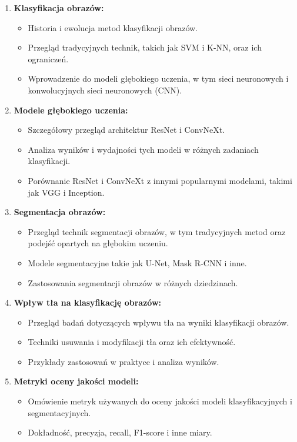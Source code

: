 \begin{enumerate}
    \item \textbf{Klasyfikacja obrazów:}
    \begin{itemize}
        \item Historia i ewolucja metod klasyfikacji obrazów.
        \item Przegląd tradycyjnych technik, takich jak SVM i K-NN, oraz ich ograniczeń.
        \item Wprowadzenie do modeli głębokiego uczenia, w tym sieci neuronowych i 
        konwolucyjnych sieci neuronowych (CNN).
    \end{itemize}
    \item \textbf{Modele głębokiego uczenia:}
    \begin{itemize}
        \item Szczegółowy przegląd architektur ResNet i ConvNeXt.
        \item Analiza wyników i wydajności tych modeli w różnych zadaniach klasyfikacji.
        \item Porównanie ResNet i ConvNeXt z innymi popularnymi modelami, takimi jak VGG i Inception.
    \end{itemize}
    \item \textbf{Segmentacja obrazów:}
    \begin{itemize}
        \item Przegląd technik segmentacji obrazów, w tym tradycyjnych metod oraz 
        podejść opartych na głębokim uczeniu.
        \item Modele segmentacyjne takie jak U-Net, Mask R-CNN i inne.
        \item Zastosowania segmentacji obrazów w różnych dziedzinach.
    \end{itemize}
    \item \textbf{Wpływ tła na klasyfikację obrazów:}
    \begin{itemize}
        \item Przegląd badań dotyczących wpływu tła na wyniki klasyfikacji obrazów.
        \item Techniki usuwania i modyfikacji tła oraz ich efektywność.
        \item Przykłady zastosowań w praktyce i analiza wyników.
    \end{itemize}
    \item \textbf{Metryki oceny jakości modeli:}
    \begin{itemize}
        \item Omówienie metryk używanych do oceny jakości modeli klasyfikacyjnych i segmentacyjnych.
        \item Dokładność, precyzja, recall, F1-score i inne miary.
    \end{itemize}
\end{enumerate}

